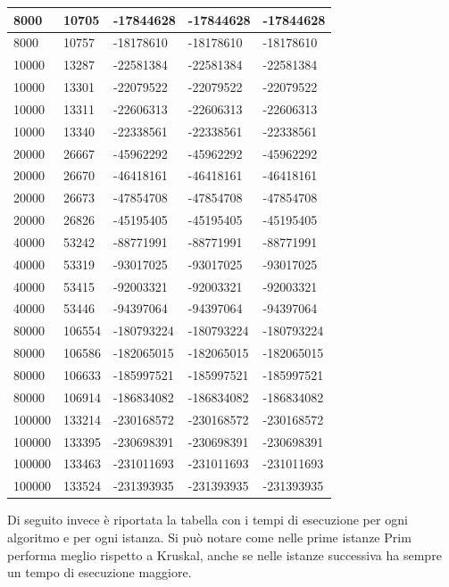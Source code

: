\begin{longtable}[H]{|p{1.5cm}|p{1.5cm}|p{2cm}|p{3cm}|p{4cm}|}
    8000 & 10705 & -17844628 & -17844628 & -17844628 \\ \hline
    8000 & 10757 & -18178610 & -18178610 & -18178610 \\ \hline  
    10000 & 13287 & -22581384 & -22581384 & -22581384 \\ \hline
    10000 & 13301 & -22079522 & -22079522 & -22079522 \\ \hline
    10000 & 13311 & -22606313 & -22606313 & -22606313 \\ \hline
    10000 & 13340 & -22338561 & -22338561 & -22338561 \\ \hline 
    20000 & 26667 & -45962292 & -45962292 & -45962292 \\ \hline
    20000 & 26670 & -46418161 & -46418161 & -46418161 \\ \hline
    20000 & 26673 & -47854708 & -47854708 & -47854708 \\ \hline
    20000 & 26826 & -45195405 & -45195405 & -45195405 \\ \hline
    40000 & 53242 & -88771991 & -88771991 & -88771991 \\ \hline
    40000 & 53319 & -93017025 & -93017025 & -93017025 \\ \hline
    40000 & 53415 & -92003321 & -92003321 & -92003321 \\ \hline
    40000 & 53446 & -94397064 & -94397064 & -94397064 \\ \hline
    80000 & 106554 & -180793224 & -180793224 & -180793224 \\ \hline 
    80000 & 106586 & -182065015 & -182065015 & -182065015 \\ \hline 
    80000 & 106633 & -185997521 & -185997521 & -185997521 \\ \hline
    80000 & 106914 & -186834082 & -186834082 & -186834082 \\ \hline
    100000 & 133214 & -230168572 & -230168572 & -230168572 \\ \hline
    100000 & 133395 & -230698391 & -230698391 & -230698391 \\ \hline
    100000 & 133463 & -231011693 & -231011693 & -231011693 \\ \hline
    100000 & 133524 & -231393935 & -231393935 & -231393935  \\ \hline
\end{longtable}
\newpage
Di seguito invece è riportata la tabella con i tempi di esecuzione per ogni algoritmo e per ogni istanza. Si può notare come nelle prime istanze Prim performa meglio rispetto a Kruskal, anche se nelle istanze successiva ha sempre un tempo di esecuzione maggiore.
